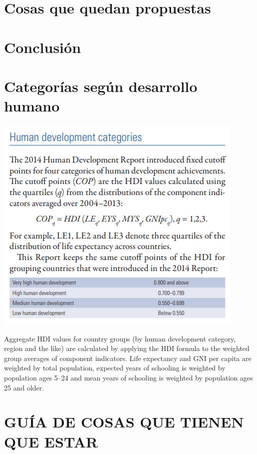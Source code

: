 \documentclass[
  10pt,
]{article}
\begin{document}
\hypertarget{cosas-que-quedan-propuestas}{%
\section{Cosas que quedan
propuestas}\label{cosas-que-quedan-propuestas}}

\hypertarget{conclusiuxf3n}{%
\section{Conclusión}\label{conclusiuxf3n}}

\hypertarget{categoruxedas-seguxfan-desarrollo-humano}{%
\section{Categorías según desarrollo
humano}\label{categoruxedas-seguxfan-desarrollo-humano}}

\includegraphics{agregar1.png}

Aggregate HDI values for country groups (by human development category,
region and the like) are calculated by applying the HDI formula to the
weighted group averages of component indicators. Life expectancy and GNI
per capita are weighted by total population, expected years of schooling
is weighted by population ages 5--24 and mean years of schooling is
weighted by population ages 25 and older.

\pagebreak

\hypertarget{guuxeda-de-cosas-que-tienen-que-estar}{%
\section{GUÍA DE COSAS QUE TIENEN QUE
ESTAR}\label{guuxeda-de-cosas-que-tienen-que-estar}}
\end{document}
